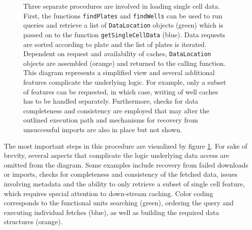 \begin{figure}
  \caption[Simplified view of the steps involved in loading single cell data.]{Three separate procedures are involved in loading single cell data. First, the functions \texttt{findPlates} and \texttt{findWells} can be used to run queries and retrieve a list of \texttt{DataLocation} objects (green) which is passed on to the function \texttt{getSingleCellData} (blue). Data requests are sorted according to plate and the list of plates is iterated. Dependent on request and availability of caches, \texttt{DataLocation} objects are assembled (orange) and returned to the calling function. This diagram represents a simplified view and several additional features complicate the underlying logic. For example, only a subset of features can be requested, in which case, writing of well caches has to be handled separately. Furthermore, checks for data completeness and consistency are employed that may alter the outlined execution path and mechanisms for recovery from unsuccessful imports are also in place but not shown.}
  \label{fig:scf-data-import}
\end{figure}

The most important steps in this procedure are visualized by figure \ref{fig:scf-data-import}. For sake of brevity, several aspects that complicate the logic underlying data access are omitted from the diagram. Some examples include recovery from failed downloads or imports, checks for completeness and consistency of the fetched data, issues involving metadata and the ability to only retrieve a subset of single cell feature, which requires special attention to down-stream caching. Color coding corresponds to the functional units searching (green), ordering the query and executing individual fetches (blue), as well as building the required data structures (orange). 


